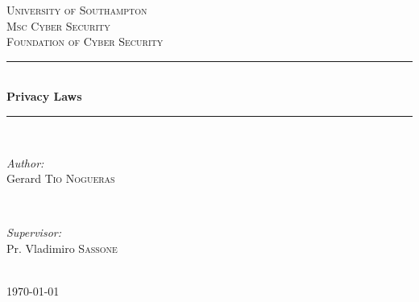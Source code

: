 \documentclass[9pt]{article}
\begin{document}

\begin{titlepage}

\newcommand{\HRule}{\rule{\linewidth}{0.5mm}}
\center
\textsc{\LARGE University of Southampton}\\[1.5cm]
\textsc{\Large Msc Cyber Security}\\[0.5cm]
\textsc{\large Foundation of Cyber Security}\\[0.5cm]
\HRule \\[0.4cm]
{ \huge \bfseries Privacy Laws}\\[0.4cm]
\HRule \\[1.5cm]

\begin{minipage}{0.4\textwidth}
\begin{flushleft} \large
\emph{Author:}\\
Gerard \textsc{Tio Nogueras}
\end{flushleft}
\end{minipage}
~
\begin{minipage}{0.4\textwidth}
\begin{flushright} \large
\emph{Supervisor:} \\
Pr. Vladimiro \textsc{Sassone}
\end{flushright}
\end{minipage}\\[4cm]

{\large \today}\\[3cm]

\vfill
\end{titlepage}
\end{document}
